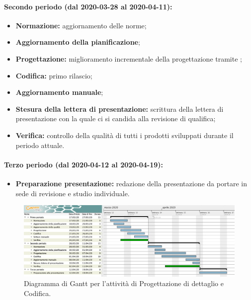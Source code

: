 				\paragraph{Secondo periodo (dal 2020-03-28 al 2020-04-11):}
				
					\begin{itemize}
						\item \textbf{Normazione:} aggiornamento delle norme;
						\item \textbf{Aggiornamento della pianificazione};
						\item \textbf{Progettazione:} miglioramento incrementale della progettazione tramite ;
						\item \textbf{Codifica:} primo rilascio;
						\item \textbf{Aggiornamento manuale};
						\item \textbf{Stesura della lettera di presentazione:} scrittura della lettera di presentazione con la quale ci si candida alla revisione di qualifica;
						\item \textbf{Verifica:} controllo della qualità di tutti i prodotti sviluppati durante il periodo attuale.
					\end{itemize}
		
				\paragraph{Terzo periodo (dal 2020-04-12 al 2020-04-19):}
				
					\begin{itemize}
						\item \textbf{Preparazione presentazione:} redazione della presentazione da portare in sede di revisione e studio individuale.
					\end{itemize}
		

		\begin{landscape}

          \begin{figure}[H]
            \centering
            \includegraphics[width=\linewidth]{images/ganttDettaglioCodifica}
            \caption{Diagramma di Gantt per l'attività di Progettazione di dettaglio e Codifica.}
          \end{figure}		

		\end{landscape}


